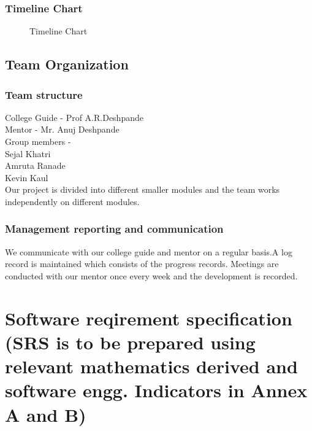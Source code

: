 \documentclass[oneside,a4paper,12pt]{report}
\begin{document}
\subsection{Timeline Chart}  

\begin{center}
	\begin{figure}[!htbp]
		\centering
	  \caption{Timeline Chart}
	  \label{fig:act-dig}
	\end{figure}
\end{center}  



 
\section{Team Organization}
\subsection{Team structure}
College Guide - Prof A.R.Deshpande\\
Mentor - Mr. Anuj Deshpande \\
Group members -\\
Sejal Khatri\\
Amruta Ranade\\
Kevin Kaul\\
Our project is divided into different smaller modules and the team works independently on  different modules.


\subsection{Management reporting and communication}
We communicate with our college guide and mentor on a regular basis.A log record is maintained which consists of the progress records.
Meetings are conducted with our mentor once every week and the development is recorded.
\chapter{Software reqirement specification  (SRS is to be prepared using relevant mathematics derived and software engg. Indicators in Annex A and B)}
\end{document}

